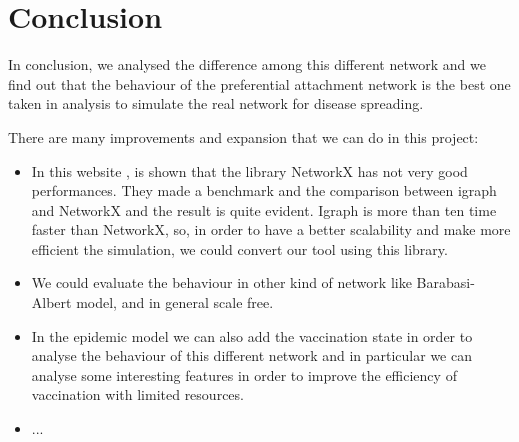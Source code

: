 
\section{Conclusion}
    In conclusion, we analysed the difference among this different network and we find out that the behaviour of the preferential attachment network is the best one taken in analysis to simulate the real network for disease spreading.
    
    There are many improvements and expansion that we can do in this project:
    \begin{itemize}
        \item In this website \cite{performanceGraphTool}, is shown that the library NetworkX has not very good performances. They made a benchmark and the comparison between igraph~\cite{igraph} and NetworkX and the result is quite evident. Igraph is more than ten time faster than NetworkX, so, in order to have a better scalability and make more efficient the simulation, we could convert our tool using this library.
        \item We could evaluate the behaviour in other kind of network like Barabasi-Albert model, and in general scale free.
        \item In the epidemic model we can also add the vaccination state in order to analyse the behaviour of this different network and in particular we can analyse some interesting features in order to improve the efficiency of vaccination with limited resources.
        \item ...
    \end{itemize}